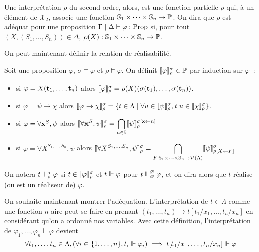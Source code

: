 \documentclass{article}
\begin{document}
Une interprétation $\rho$ du second ordre, alors, est une fonction partielle $\rho$ qui, à un élément de $\mathcal X_2$, associe une fonction $\mathbb{S}_1\times\cdots\times\mathbb{S}_n \to \mathbb{P}$. On dira que $\rho$ est adéquat pour une proposition $\Gamma\mid\Delta\vdash \varphi : \mathrm{Prop}$ si, pour tout $(X, (S_1,\ldots,S_n))\in \Delta$, $\rho(X) : \mathbb{S}_1\times\cdots\times\mathbb{S}_n \to \mathbb{P}$.

On peut maintenant définir la relation de réalisabilité.

\begin{defi}
    Soit une proposition $\varphi$, $\sigma\models \varphi$ et $\rho\models \varphi$. On définit $\llbracket \varphi \rrbracket_\rho^\sigma \in \mathcal {\mathbb{P}}$ par induction sur $\varphi$~:
    \begin{itemize}
        \item si $\varphi = X(\mathbf{t}_1,\ldots,\mathbf{t}_n)$ alors $\llbracket \varphi \rrbracket_\rho^\sigma = \rho(X)(\sigma(\mathbf{t}_1),\ldots,\sigma(\mathbf{t}_n))$.
        \item si $\varphi = \psi \to \chi$ alors $\llbracket \varphi\to\chi \rrbracket_\rho^\sigma = \{t \in \Lambda\mid \forall u \in \llbracket \psi \rrbracket_\rho^\sigma, t\;u \in \llbracket \chi \rrbracket_\rho^\sigma\}$.
        \item si $\varphi = \forall \mathbf{x}^S, \psi$ alors $\displaystyle\llbracket \forall \mathbf{x}^S, \psi \rrbracket_\rho^\sigma = \bigcap_{n \in \mathbb{S}} \llbracket \psi \rrbracket_\rho^{\sigma[\mathbf{x}\leftarrow n]}$
        \item si $\varphi = \forall X^{S_1,\ldots,S_n}, \psi$ alors $\displaystyle\llbracket \forall X^{S_1,\ldots,S_n},\psi \rrbracket_\rho^\sigma = \bigcap_{F : \mathbb{S}_1\times\cdots\times\mathbb{S}_n \to \mathcal P(\Lambda)} \llbracket \psi \rrbracket_{\rho[X\leftarrow F]}^\sigma$
    \end{itemize}

    On notera $t\Vdash_\rho^\sigma \varphi$ si $t\in\llbracket \varphi \rrbracket_\rho^\sigma$ et $t\Vdash\varphi$ pour $t\Vdash_\varnothing^\varnothing\varphi$, et on dira alors que $t$ réalise (ou est un réaliseur de) $\varphi$.
\end{defi}

On souhaite maintenant montrer l'adéquation. L'interprétation de $t\in \Lambda$ comme une fonction $n$-aire peut se faire en prenant $(t_1,\ldots,t_n) \mapsto t[t_1/x_1,\ldots,t_n/x_n]$ en considérant qu'on a ordonné nos variables. Avec cette définition, l'interprétation de $\varphi_1,\ldots,\varphi_n\vdash \varphi$ devient
\[\forall t_1,\ldots,t_n \in \Lambda, (\forall i \in \{1,\ldots,n\}, t_i \Vdash \varphi_i)\implies t[t_1/x_1,\ldots,t_n/x_n]\Vdash\varphi\]
\end{document}
